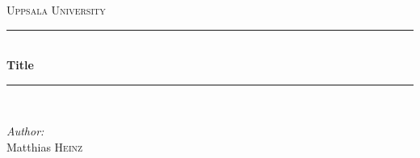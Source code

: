 \documentclass[12pt]{memoir}
\begin{document}



\frontmatter

\begin{titlingpage}

\newcommand{\HRule}{\rule{\linewidth}{0.5mm}} %

\center %


\textsc{\LARGE Uppsala University}\\[1.5cm] %


\HRule \\[0.4cm]
{ \huge \bfseries Title}\\[0.4cm] %
\HRule \\[1.5cm]


\begin{minipage}{0.4\textwidth}
\begin{flushleft} \large
\emph{Author:}\\
Matthias \textsc{Heinz}\\ %
\end{flushleft}


\end{minipage}
\end{titlingpage}
\end{document}
